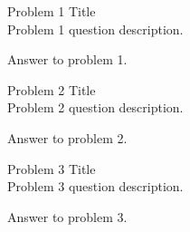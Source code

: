 \documentclass{assignment}
\begin{document}
\begin{problemlist}
\pbitem Problem 1 Title \\
Problem 1 question description.
\begin{problem}
\begin{answer}
\par Answer to problem 1.
\end{answer}
\end{problem}

\pbitem Problem 2 Title \\
Problem 2 question description.
\begin{problem}
\begin{answer}
\par Answer to problem 2.
\end{answer}
\end{problem}

\pbitem Problem 3 Title \\
Problem 3 question description.
\begin{problem}
\begin{answer}
\par Answer to problem 3.
\cite{EXAMPLE}
\end{answer}
\end{problem}
\end{problemlist}

 

\end{document}
